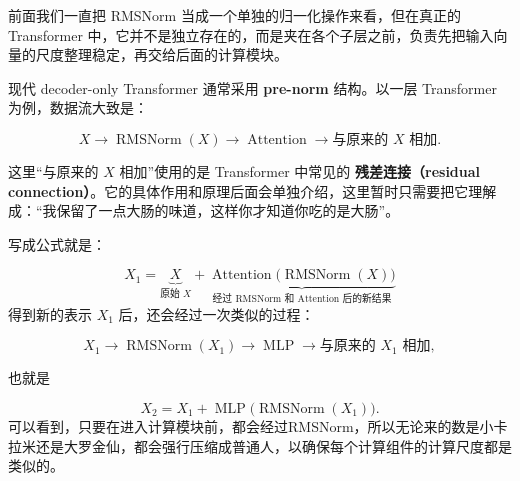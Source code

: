 \documentclass[UTF8,11pt,a4paper]{ctexart}
\begin{document}
前面我们一直把 RMSNorm 当成一个单独的归一化操作来看，但在真正的 Transformer 中，它并不是独立存在的，而是夹在各个子层之前，负责先把输入向量的尺度整理稳定，再交给后面的计算模块。

现代 decoder-only Transformer 通常采用 \textbf{pre-norm} 结构。以一层 Transformer 为例，数据流大致是：

\[
X
\longrightarrow
\operatorname{RMSNorm}(X)
\longrightarrow
\operatorname{Attention}
\longrightarrow
\text{与原来的 }X\text{ 相加}.
\]

这里“与原来的 $X$ 相加”使用的是 Transformer 中常见的
\textbf{残差连接（residual connection）}。它的具体作用和原理后面会单独介绍，这里暂时只需要把它理解成：“我保留了一点大肠的味道，这样你才知道你吃的是大肠”。

写成公式就是：

\[
X_1
=
\underbrace{X}_{\text{原始 }X}
+
\underbrace{
\operatorname{Attention}
\bigl(\operatorname{RMSNorm}(X)\bigr)
}_{\text{经过 RMSNorm 和 Attention 后的新结果}}
\]
得到新的表示 $X_1$ 后，还会经过一次类似的过程：

\[
X_1
\longrightarrow
\operatorname{RMSNorm}(X_1)
\longrightarrow
\operatorname{MLP}
\longrightarrow
\text{与原来的 }X_1\text{ 相加},
\]

也就是

\[
X_2
=
X_1
+
\operatorname{MLP}
\bigl(\operatorname{RMSNorm}(X_1)\bigr).
\]
可以看到，只要在进入计算模块前，都会经过RMSNorm，所以无论来的数是小卡拉米还是大罗金仙，都会强行压缩成普通人，以确保每个计算组件的计算尺度都是类似的。
\end{document}
